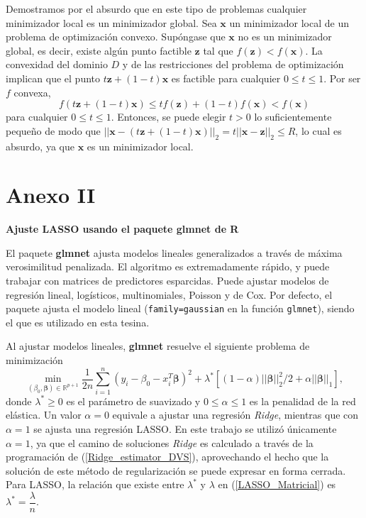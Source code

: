 \documentclass[a4paper,12pt]{report}
\begin{document}
Demostramos por el absurdo que en este tipo de problemas cualquier minimizador local es un minimizador global. Sea $\boldsymbol{x}$ un minimizador local de un problema de optimización convexo. Supóngase que $\boldsymbol{x}$ no es un minimizador global, es decir, existe algún punto factible $\boldsymbol{z}$ tal que $f(\boldsymbol{z})<f(\boldsymbol{x})$. La convexidad del dominio $D$ y de las restricciones del problema de optimización implican que el punto $t\boldsymbol{z}+(1-t)\boldsymbol{x}$ es factible para cualquier $0\leq t \leq 1$. Por ser $f$ convexa,
\begin{equation}
f(t\boldsymbol{z}+(1-t)\boldsymbol{x}) \leq tf(\boldsymbol{z})+(1-t)f(\boldsymbol{x}) < f(\boldsymbol{x})
\end{equation}
para cualquier $0\leq t \leq 1$. Entonces, se puede elegir $t>0$ lo suficientemente pequeño de modo que $||\boldsymbol{x}-(t\boldsymbol{z}+(1-t)\boldsymbol{x})||_2=t||\boldsymbol{x}-\boldsymbol{z}||_2 \leq R$, lo cual es absurdo, ya que $\boldsymbol{x}$ es un minimizador local.

\chapter*{Anexo II}
{\textbf{\Large{Ajuste LASSO usando el paquete glmnet de R}}}

\newpage

El paquete \textbf{glmnet} ajusta modelos lineales generalizados a través de máxima verosimilitud penalizada. El algoritmo es extremadamente rápido, y puede trabajar con matrices de predictores esparcidas. Puede ajustar modelos de regresión lineal, logísticos, multinomiales, Poisson y de Cox. Por defecto, el paquete ajusta el modelo lineal (\texttt{family=gaussian} en la función \texttt{glmnet}), siendo el que es utilizado en esta tesina.

Al ajustar modelos lineales, \textbf{glmnet} resuelve el siguiente problema de minimización
$$
\min_{(\beta_0, \boldsymbol{\beta}) \in \mathbb{R}^{p+1}}\frac{1}{2n} \sum_{i=1}^n (y_i -\beta_0-x_i^T \boldsymbol{\beta})^2+\lambda^* \left[ (1-\alpha)||\boldsymbol{\beta}||_2^2/2 + \alpha||\boldsymbol{\beta}||_1\right],
$$
donde \(\lambda^* \geq 0\) es el parámetro de suavizado y \(0 \leq \alpha \leq 1\) es la penalidad de la red elástica. Un valor \(\alpha = 0\) equivale a ajustar una regresión \textit{Ridge}, mientras que con \(\alpha = 1\) se ajusta una regresión LASSO. En este trabajo se utilizó únicamente $\alpha=1$, ya que el camino de soluciones \textit{Ridge} es calculado a través de la programación de (\ref{Ridge_estimator_DVS}), aprovechando el hecho que la solución de este método de regularización se puede expresar en forma cerrada. Para LASSO, la relación que existe entre $\lambda^*$ y $\lambda$ en (\ref{LASSO_Matricial}) es $\lambda^*=\dfrac{\lambda}{n}$.
\end{document}
